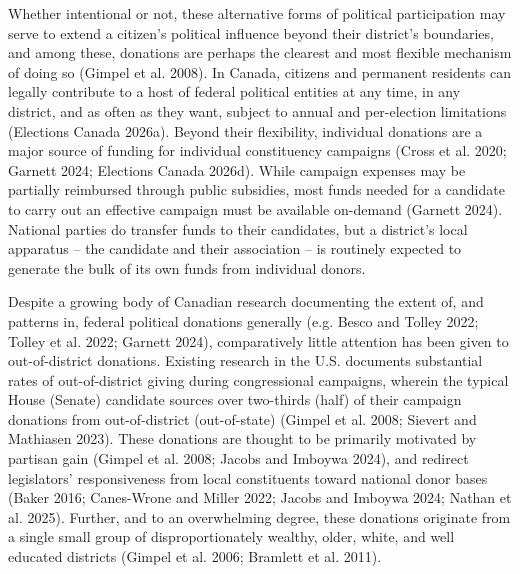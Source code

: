 \documentclass[
  letterpaper,
  DIV=11,
  numbers=noendperiod]{scrartcl}
\begin{document}
Whether intentional or not, these alternative forms of political
participation may serve to extend a citizen's political influence beyond
their district's boundaries, and among these, donations are perhaps the
clearest and most flexible mechanism of doing so (Gimpel et al. 2008).
In Canada, citizens and permanent residents can legally contribute to a
host of federal political entities at any time, in any district, and as
often as they want, subject to annual and per-election limitations
(Elections Canada 2026a). Beyond their flexibility, individual donations
are a major source of funding for individual constituency campaigns
(Cross et al. 2020; Garnett 2024; Elections Canada 2026d). While
campaign expenses may be partially reimbursed through public subsidies,
most funds needed for a candidate to carry out an effective campaign
must be available on-demand (Garnett 2024). National parties do transfer
funds to their candidates, but a district's local apparatus -- the
candidate and their association -- is routinely expected to generate the
bulk of its own funds from individual donors.

Despite a growing body of Canadian research documenting the extent of,
and patterns in, federal political donations generally (e.g. Besco and
Tolley 2022; Tolley et al. 2022; Garnett 2024), comparatively little
attention has been given to out-of-district donations. Existing research
in the U.S. documents substantial rates of out-of-district giving during
congressional campaigns, wherein the typical House (Senate) candidate
sources over two-thirds (half) of their campaign donations from
out-of-district (out-of-state) (Gimpel et al. 2008; Sievert and
Mathiasen 2023). These donations are thought to be primarily motivated
by partisan gain (Gimpel et al. 2008; Jacobs and Imboywa 2024), and
redirect legislators' responsiveness from local constituents toward
national donor bases (Baker 2016; Canes-Wrone and Miller 2022; Jacobs
and Imboywa 2024; Nathan et al. 2025). Further, and to an overwhelming
degree, these donations originate from a single small group of
disproportionately wealthy, older, white, and well educated districts
(Gimpel et al. 2006; Bramlett et al. 2011).
\end{document}
